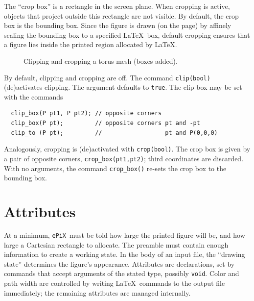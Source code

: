\documentclass[12pt]{report}
\newcommand{\code}[1]{\texttt{#1}}
\newcommand{\ePiX}{\code{ePiX}}
\begin{document}
The ``crop box'' is a rectangle in the screen plane.
When cropping is active, objects that project outside this rectangle
are not visible.  By default, the crop box is the bounding
box. Since the figure is drawn (on the page) by
affinely scaling the bounding box to a specified \LaTeX\ box, default
cropping ensures that a figure lies inside the printed region
allocated by \LaTeX.
\begin{figure}[hbt]
  \begin{center}
    
  \end{center}
  \caption{Clipping and cropping a torus mesh (boxes added).}
  \label{fig:crop}
\end{figure}

By default, clipping and cropping are off. The command
\code{clip(bool)} (de)activates clipping. The argument defaults to
\code{true}. The clip box may be set with the commands
\begin{verbatim}
  clip_box(P pt1, P pt2); // opposite corners
  clip_box(P pt);         // opposite corners pt and -pt
  clip_to (P pt);         //                  pt and P(0,0,0)
\end{verbatim}
Analogously, cropping is (de)activated with \code{crop(bool)}. The crop
box is given by a pair of opposite corners, \code{crop\_box(pt1,pt2)};
third coordinates are discarded. With no arguments, the command
\code{crop\_box()} re-sets the crop box to the bounding box.


\section{Attributes}

At a minimum, \ePiX\ must be told how large the printed figure will
be, and how large a Cartesian rectangle to allocate. The preamble must
contain enough information to create a working state.  In the body of
an input file, the ``drawing state'' determines the figure's
appearance. Attributes are declarations, set by commands that accept
arguments of the stated type, possibly \code{void}. Color and path
width are controlled by writing \LaTeX\ commands to the output file
immediately; the remaining attributes are managed internally.
\end{document}
